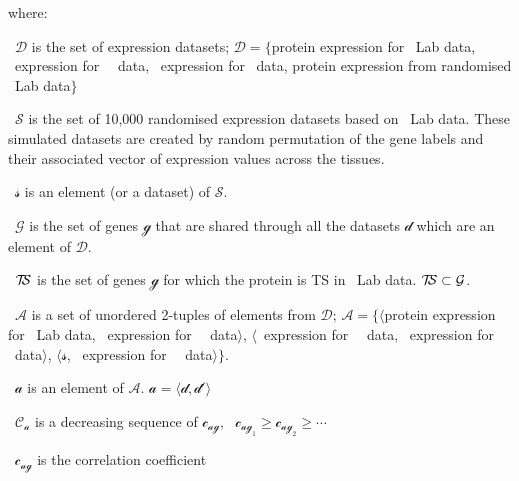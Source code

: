    where:
     \quad\begin{eqlist}[\setlength{\itemsep}{0em}%
         \setlength{\topsep}{0em}%
         \setlength{\partopsep}{0em}%
         \setlength{\parskip}{0em}%
         \setlength{\parsep}{0em}]
         \item[\textbullet\ $\mathcal{D}$] is the set of expression datasets;
             $\mathcal{D}=\{$protein expression for \pandey\ Lab data,
             \mRNA\ expression for \uhlen\ \etal\ data,
             \mRNA\ expression for \gtex\ data,
             protein expression from randomised \pandey\ Lab data$\}$
         \item[\textbullet\ $\mathcal{S}$] is the set of 10,000
             randomised expression datasets based on \pandey\ Lab data.
             These simulated datasets are created
             by random permutation of the gene labels and
             their associated vector of expression values across the tissues.
         \item[\textbullet\ $\mathcal{s}$] is an element (or a dataset) of $\mathcal{S}$.
         \item[\textbullet\ $\mathcal{G}$] is the set of genes $\mathcal{g}$
             that are shared through all the datasets $\mathcal{d}$
             which are an element of $\mathcal{D}$.
         \item[\textbullet\ $\TSm$] is the set of genes $\mathcal{g}$
             for which the protein is \gls{TS} in \pandey\ Lab data.
             $\TSm \subset \mathcal{G}$.
         \item[\textbullet\ $\mathcal{A}$] is a set of unordered 2-tuples
              of elements from $\mathcal{D}$;
              $\mathcal{A}=\{\langle$protein expression for \pandey\ Lab data,
              \mRNA\ expression for \uhlen\ \etal\ data$\rangle$,
              $\langle$\mRNA\ expression for \uhlen\ \etal\ data,
              \mRNA\ expression for \gtex\ data$\rangle$,
              $\langle \mathcal{s}$,
              \mRNA\ expression for \uhlen\ \etal\ data$\rangle\}$.
         \item[\textbullet\ $\mathcal{a}$] is an element of $\mathcal{A}$.
             $\mathcal{a}=\langle\mathcal{d,d'}\rangle$
         \item[\textbullet\ $\mathcal{C_a}$] is a decreasing sequence of $\mathcal{c_{ag}}$,
             \ie\ $\mathcal{c_{ag_{1}}}≥ \mathcal{c_{ag_{2}}}≥ \cdots$%
         \item[\textbullet\ $\mathcal{c_{ag}}$] is the correlation coefficient

\end{eqlist}
